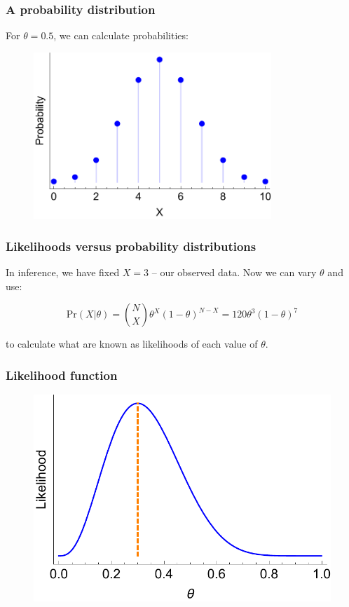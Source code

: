 \documentclass[handout]{beamer}
\begin{document}
\begin{frame}
	\frametitle{A probability distribution}
	For $\theta=0.5$, we can calculate probabilities:
	
	\begin{figure}[h]
		\centerline{\includegraphics[width=0.8\textwidth]{figures/binomial.pdf}}
	\end{figure}

\end{frame}

\begin{frame}
	\frametitle{Likelihoods versus probability distributions}
	In inference, we have fixed $X=3$ -- our observed data. Now we can vary $\theta$ and use:
	
		\begin{equation}
		\text{Pr}(X|\theta) = \binom{N}{X} \theta^X (1- \theta)^{N-X} = 120 \theta^3 (1-\theta)^7
		\end{equation}
		
	to calculate what are known as likelihoods of each value of $\theta$.
	
\end{frame}

\begin{frame}
	\frametitle{Likelihood function}
	
	\begin{figure}[h]
		\centerline{\includegraphics[width=1\textwidth]{figures/binomial_likelihood_eg.pdf}}
	\end{figure}
	
\end{frame}
\end{document}

